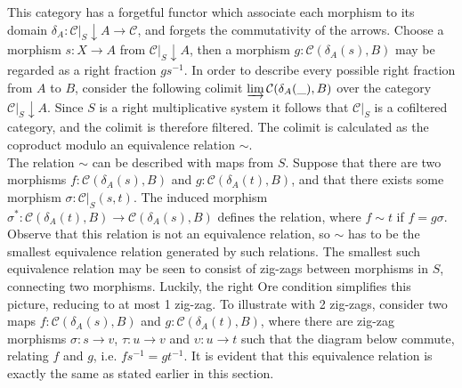     This category has a forgetful functor which associate each morphism to its domain $\delta_{A} : \mathcal{C}|_{S}\downarrow A \rightarrow \mathcal{C}$, and forgets the commutativity of the arrows. Choose a morphism $s : X \rightarrow A$ from $\mathcal{C}|_{S}\downarrow A$, then a morphism $g:\mathcal{C}(\delta_{A}(s),B)$ may be regarded as a right fraction $gs^{-1}$. In order to describe every possible right fraction from $A$ to $B$, consider the following colimit $\varinjlim\mathcal{C}(\delta_{A}(\_),B)$ over the category $\mathcal{C}|_{S}\downarrow A$. Since $S$ is a right multiplicative system it follows that $\mathcal{C}|_{S}$ is a cofiltered category, and the colimit is therefore filtered. The colimit is calculated as the coproduct modulo an equivalence relation $\sim$. \\
    
    The relation $\sim$ can be described with maps from $S$. Suppose that there are two morphisms $f : \mathcal{C}(\delta_A(s),B)$ and $g : \mathcal{C}(\delta_A(t),B)$, and that there exists some morphism $\sigma : \mathcal{C}|_{S}(s,t)$. The induced morphism $\sigma^* : \mathcal{C}(\delta_A(t),B) \rightarrow \mathcal{C}(\delta_A(s),B)$ defines the relation, where $f \sim t$ if $f = g\sigma$. Observe that this relation is not an equivalence relation, so $\sim$ has to be the smallest equivalence relation generated by such relations. The smallest such equivalence relation may be seen to consist of zig-zags between morphisms in $S$, connecting two morphisms. Luckily, the right Ore condition simplifies this picture, reducing to at most 1 zig-zag. To illustrate with 2 zig-zags, consider two maps $f : \mathcal{C}(\delta_A(s),B)$ and $g : \mathcal{C}(\delta_A(t),B)$, where there are zig-zag morphisms $\sigma : s \rightarrow v$, $\tau : u \rightarrow v$ and $\upsilon : u \rightarrow t$ such that the diagram below commute, relating $f$ and $g$, i.e. $fs^{-1}=gt^{-1}$. It is evident that this equivalence relation is exactly the same as stated earlier in this section.

    \begin{center}
    \end{center}

